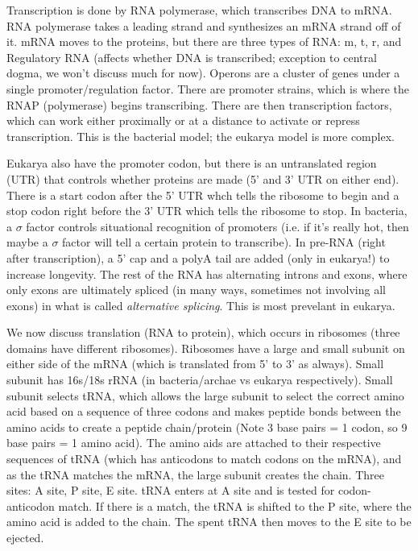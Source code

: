 \documentclass[12pt]{article}
\begin{document}
Transcription is done by RNA polymerase, which transcribes DNA to mRNA. RNA polymerase takes a leading strand and synthesizes an mRNA strand off of it. mRNA moves to the proteins, but there are three types of RNA: m, t, r, and Regulatory RNA (affects whether DNA is transcribed; exception to central dogma, we won't discuss much for now). Operons are a cluster of genes under a single promoter/regulation factor. There are promoter strains, which is where the RNAP (polymerase) begins transcribing. There are then transcription factors, which can work either proximally or at a distance to activate or repress transcription. This is the bacterial model; the eukarya model is more complex.

Eukarya also have the promoter codon, but there is an untranslated region (UTR) that controls whether proteins are made (5' and 3' UTR on either end). There is a start codon after the 5' UTR whch tells the ribosome to begin and a stop codon right before the 3' UTR which tells the ribosome to stop. In bacteria, a $\sigma$ factor controls situational recognition of promoters (i.e. if it's really hot, then maybe a $\sigma$ factor will tell a certain protein to transcribe). In pre-RNA (right after transcription), a 5' cap and a polyA tail are added (only in eukarya!) to increase longevity. The rest of the RNA has alternating introns and exons, where only exons are ultimately spliced (in many ways, sometimes not involving all exons) in what is called \emph{alternative splicing}. This is most prevelant in eukarya. 

We now discuss translation (RNA to protein), which occurs in ribosomes (three domains have different ribosomes). Ribosomes have a large and small subunit on either side of the mRNA (which is translated from 5' to 3' as always). Small subunit has 16s/18s rRNA (in bacteria/archae vs eukarya respectively). Small subunit selects tRNA, which allows the large subunit to select the correct amino acid based on a sequence of three codons and makes peptide bonds between the amino acids to create a peptide chain/protein (Note 3 base pairs = 1 codon, so 9 base pairs = 1 amino acid). The amino aids are attached to their respective sequences of tRNA (which has anticodons to match codons on the mRNA), and as the tRNA matches the mRNA, the large subunit creates the chain. Three sites: A site, P site, E site. tRNA enters at A site and is tested for codon-anticodon match. If there is a match, the tRNA is shifted to the P site, where the amino acid is added to the chain. The spent tRNA then moves to the E site to be ejected.
\end{document}
